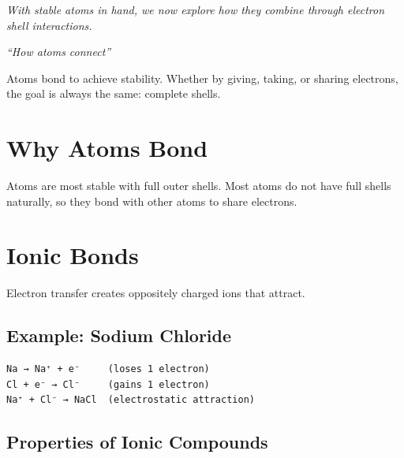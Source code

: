 \documentclass[
  11pt,
  letterpaper,
  twoside,
  openright]{book}
\begin{document}
\emph{With stable atoms in hand, we now explore how they combine through
electron shell interactions.}

\emph{``How atoms connect''}

\begin{tcolorbox}[enhanced jigsaw, coltitle=black, colbacktitle=quarto-callout-note-color!10!white, toprule=.15mm, colframe=quarto-callout-note-color-frame, arc=.35mm, opacityback=0, bottomtitle=1mm, toptitle=1mm, breakable, colback=white, titlerule=0mm, opacitybacktitle=0.6, title=\textcolor{quarto-callout-note-color}{\faInfo}\hspace{0.5em}{Key Revelation}, rightrule=.15mm, bottomrule=.15mm, leftrule=.75mm, left=2mm]

Atoms bond to achieve stability. Whether by giving, taking, or sharing
electrons, the goal is always the same: complete shells.

\end{tcolorbox}

\section{Why Atoms Bond}\label{why-atoms-bond}

Atoms are most stable with full outer shells. Most atoms do not have
full shells naturally, so they bond with other atoms to share electrons.

\section{Ionic Bonds}\label{ionic-bonds}

Electron transfer creates oppositely charged ions that attract.

\subsection{Example: Sodium Chloride}\label{example-sodium-chloride}

\begin{verbatim}
Na → Na⁺ + e⁻     (loses 1 electron)
Cl + e⁻ → Cl⁻     (gains 1 electron)
Na⁺ + Cl⁻ → NaCl  (electrostatic attraction)
\end{verbatim}

\subsection{Properties of Ionic
Compounds}\label{properties-of-ionic-compounds}
\end{document}
